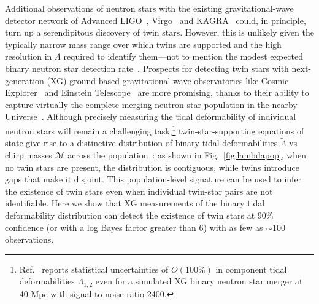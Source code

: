 \documentclass[aps,prd,twocolumn,superscriptaddress,nofootinbib]{revtex4-1}
\begin{document}
Additional observations of neutron stars with the existing gravitational-wave detector network of Advanced LIGO~\cite{aLIGO}, Virgo~\cite{aVirgo} and KAGRA~\cite{AkutsuAndo2021} could, in principle, turn up a serendipitous discovery of twin stars. However, this is unlikely given the typically narrow mass range over which twins are supported and the high resolution in $\Lambda$ required to identify them---not to mention the modest expected binary neutron star detection rate~\cite{AbbottAbbott2018_ObservingScenarios,ColomboSalafia2022,PatricelliBernardini2022}.
Prospects for detecting twin stars with next-generation (XG) ground-based gravitational-wave observatories like Cosmic Explorer~\cite{EvansAdhikari2021} and Einstein Telescope~\cite{MaggioreVanDenBroeck2020} are more promising, thanks to their ability to capture virtually the complete merging neutron star population in the nearby Universe~\cite{EvansAdhikari2021,BorhanianSathyaprakash2022}. Although precisely measuring the tidal deformability of individual neutron stars will remain a challenging task,\footnote{Ref.~\cite{SmithBorhanian2021} reports statistical uncertainties of $O(100\%)$ in component tidal deformabilities $\Lambda_{1,2}$ even for a simulated XG binary neutron star merger at 40 Mpc with signal-to-noise ratio 2400.} twin-star-supporting equations of state give rise to a distinctive distribution of binary tidal deformabilities $\tilde{\Lambda}$ vs chirp masses $\mathcal{M}$ across the population~\cite{ChatziioannouHan2020}: as shown in Fig.~\ref{fig:lambdapop}, when no twin stars are present, the distribution is contiguous, while twins introduce gaps that make it disjoint. This population-level signature can be used to infer the existence of twin stars even when individual twin-star pairs are not identifiable. Here we show that XG measurements of the binary tidal deformability distribution can detect the existence of twin stars at 90\% confidence (or with a log Bayes factor greater than 6) with as few as $\sim 100$ observations.
\end{document}
